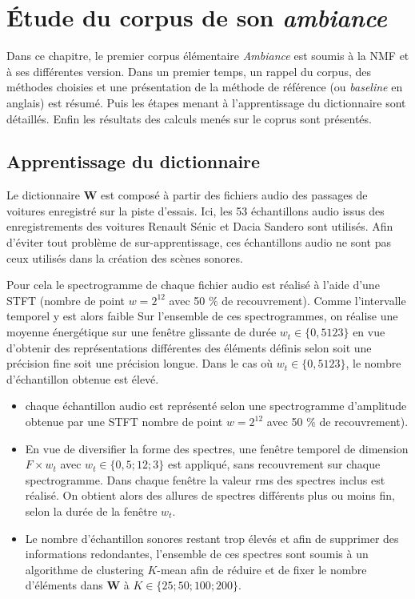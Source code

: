 
\chapter{\'Etude du corpus de son \textit{ambiance}}
\label{chap:ambiance}
Dans ce chapitre, le premier corpus élémentaire \textit{Ambiance} est soumis à la NMF et à ses différentes version.
Dans un premier temps, un rappel du corpus, des méthodes choisies et une présentation de la méthode de référence (ou \textit{baseline} en anglais) est résumé. Puis les étapes menant à l'apprentissage du dictionnaire sont détaillés. Enfin les résultats des calculs menés sur le coprus sont présentés.


\section{Apprentissage du dictionnaire}

Le dictionnaire $\mathbf{W}$ est composé à partir des fichiers audio des passages de voitures enregistré sur la piste d'essais. Ici, les 53 échantillons audio issus des enregistrements des voitures Renault Sénic et Dacia Sandero sont utilisés. Afin d'éviter tout problème de sur-apprentissage, ces échantillons audio ne sont pas ceux utilisés dans la création des scènes sonores. 

Pour cela le spectrogramme de chaque fichier audio est réalisé à l'aide d'une STFT (nombre de point $w = 2^12$ avec 50 $\%$ de recouvrement). Comme l'intervalle temporel y est alors faible
Sur l'ensemble de ces spectrogrammes, on réalise une moyenne énergétique sur une fenêtre glissante de durée $w_t \in \lbrace 0,5 1 2 3 \rbrace$ en vue d'obtenir des représentations différentes des éléments définis selon soit une précision fine soit une précision longue.
Dans le cas où $w_t \in \lbrace 0,5 1 2 3 \rbrace$, le nombre d'échantillon obtenue est élevé.

\begin{itemize}
\item chaque échantillon audio est représenté selon une spectrogramme d'amplitude obtenue par une STFT nombre de point $w = 2^{12}$ avec 50 $\%$ de recouvrement).
\item En vue de diversifier la forme des spectres, une fenêtre temporel de dimension $F \times w_t$ avec $w_t\in \lbrace 0,5; 1 2; 3 \rbrace$ est appliqué, sans recouvrement sur chaque spectrogramme. Dans chaque fenêtre la valeur rms des spectres inclus est réalisé. On obtient alors des allures de spectres différents plus ou moins fin, selon la durée de la fenêtre $w_t$.
\item Le nombre d'échantillon sonores restant trop élevés et afin de supprimer des informations redondantes, l'ensemble de ces spectres sont soumis à un algorithme de clustering $K$-mean afin de réduire et de fixer le nombre d'éléments dans $\mathbf{W}$ à $K \in \lbrace 25; 50; 100; 200 \rbrace$.
\end{itemize}

